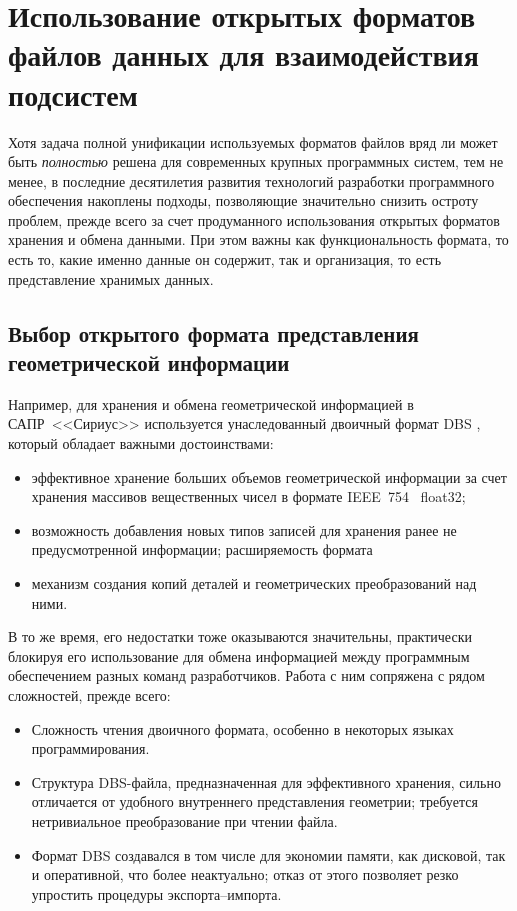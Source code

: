 
\section{
  Использование открытых форматов файлов данных для взаимодействия подсистем
}
\label{sec:json.files}

Хотя задача полной унификации
используемых форматов файлов
вряд ли может быть
\textit{полностью}
решена для современных крупных программных систем,
тем не менее,
в последние десятилетия развития технологий
разработки программного обеспечения
накоплены подходы,
позволяющие значительно снизить остроту проблем,
прежде всего за счет продуманного использования
открытых форматов хранения и обмена данными.
При этом важны как функциональность формата,
то есть то, какие именно данные он содержит,
так и организация,
то есть представление
хранимых данных.

\subsection{Выбор открытого формата представления геометрической информации}

Например, для хранения и обмена геометрической информацией
в САПР~<<Сириус>>
используется унаследованный двоичный формат DBS
\cite{bi:DBS},
который обладает важными достоинствами:
\begin{itemize}
  \item
  эффективное хранение больших объемов геометрической информации
  за счет хранения массивов вещественных чисел в формате IEEE~754~\cite{bi:IEEE754} float32;
  \item
  возможность добавления новых типов записей для хранения ранее не предусмотренной информации;
  расширяемость формата
  \item
  механизм создания копий деталей и геометрических преобразований над ними.
\end{itemize}

В то же время,
его недостатки тоже оказываются
значительны,
практически блокируя его использование
для обмена информацией между
программным обеспечением разных команд разработчиков.
Работа с ним сопряжена с рядом сложностей,
прежде всего:
\begin{itemize}
  \item
  Сложность чтения двоичного формата,
  особенно в некоторых языках программирования.
  \item
  Структура DBS-файла,
  предназначенная для эффективного хранения,
  сильно отличается от удобного внутреннего представления
  геометрии;
  требуется нетривиальное преобразование при чтении файла.
  \item
  Формат DBS создавался в том числе для экономии памяти,
  как дисковой, так и оперативной,
  что более неактуально;
  отказ от этого позволяет резко упростить процедуры экспорта--импорта.
\end{itemize}

